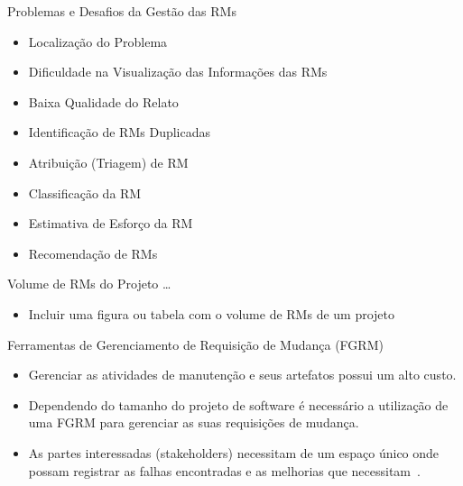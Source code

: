 \documentclass[t,14pt,mathserif]{beamer}
\begin{document}
\begin{frame}{Problemas e Desafios da Gestão das RMs}
	\begin{itemize}

        \item Localização do Problema
        \item Dificuldade na Visualização das Informações das RMs
        \item Baixa Qualidade do Relato
        \item Identificação de RMs Duplicadas
        \item Atribuição (Triagem) de RM
        \item Classificação da RM
        \item Estimativa de Esforço da RM
        \item Recomendação de RMs
	\end{itemize}
\end{frame}
\begin{frame}{Volume de RMs do Projeto \ldots}
	\begin{itemize}
         \item Incluir uma figura ou tabela com o volume de RMs de um projeto
	\end{itemize}
\end{frame}
\begin{frame}{Ferramentas de Gerenciamento de Requisição de Mudança (FGRM)}
	\begin{itemize}
        \item Gerenciar as atividades de manutenção e seus artefatos
            possui um alto custo.
        \item Dependendo do tamanho do projeto de software é necessário a
            utilização de uma FGRM para gerenciar as suas requisições de
            mudança.
        \item As partes interessadas (stakeholders) necessitam de um espaço
            único onde possam registrar as falhas encontradas e as melhorias que
            necessitam~\cite{1407819}.
	\end{itemize}
\end{frame}
\end{document}
